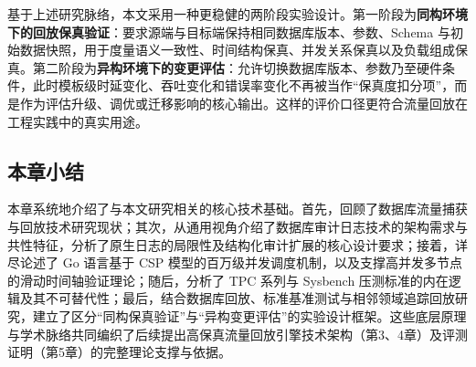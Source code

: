 基于上述研究脉络，本文采用一种更稳健的两阶段实验设计。第一阶段为\textbf{同构环境下的回放保真验证}：要求源端与目标端保持相同数据库版本、参数、Schema 与初始数据快照，用于度量语义一致性、时间结构保真、并发关系保真以及负载组成保真。第二阶段为\textbf{异构环境下的变更评估}：允许切换数据库版本、参数乃至硬件条件，此时模板级时延变化、吞吐变化和错误率变化不再被当作“保真度扣分项”，而是作为评估升级、调优或迁移影响的核心输出。这样的评价口径更符合流量回放在工程实践中的真实用途。

\subsection{本章小结}
本章系统地介绍了与本文研究相关的核心技术基础。首先，回顾了数据库流量捕获与回放技术研究现状；其次，从通用视角介绍了数据库审计日志技术的架构需求与共性特征，分析了原生日志的局限性及结构化审计扩展的核心设计要求；接着，详尽论述了 Go 语言基于 CSP 模型的百万级并发调度机制，以及支撑高并发多节点的滑动时间轴验证理论；随后，分析了 TPC 系列与 Sysbench 压测标准的内在逻辑及其不可替代性；最后，结合数据库回放、标准基准测试与相邻领域追踪回放研究，建立了区分“同构保真验证”与“异构变更评估”的实验设计框架。这些底层原理与学术脉络共同编织了后续提出高保真流量回放引擎技术架构（第3、4章）及评测证明（第5章）的完整理论支撑与依据。
